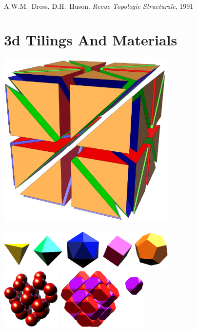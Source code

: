 \documentclass{beamer}
\begin{document}
\begin{frame}
  \begin{center}
    {\small
      A.W.M.\ Dress, D.H.\ Huson. {\it Revue Topologie Structurale}, 1991
    }
  \end{center}
\end{frame}


\section{3d Tilings And Materials}

\begin{frame}
  \begin{center}
    \includegraphics[width=3.5in]{cube-barycentric}
  \end{center}
\end{frame}

\begin{frame}
  \begin{center}
    \includegraphics[width=3.5in]{platonic}\\[1cm]
    \includegraphics[height=1.2in]{diamond-fill}
    \hspace{1cm}
    \includegraphics[height=1.2in]{diamond-voronoi}
  \end{center}
\end{frame}
\end{document}
